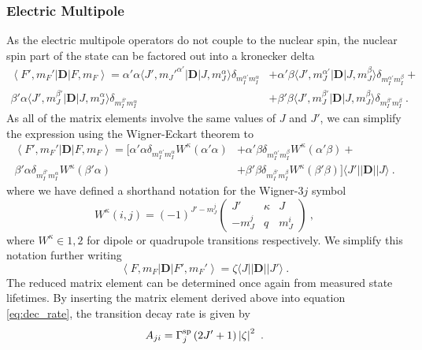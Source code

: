 \documentclass{article}
\begin{document}
\subsubsection{Electric Multipole}
As the electric multipole operators do not couple to the nuclear spin, the nuclear spin part of the state can be factored out into a kronecker delta 
\begin{equation}
\begin{split}
       \left\langle F', m_F'\right|\mathbf{D}\left|F, m_F\right\rangle = \alpha' \alpha \langle J',m_J'^{\alpha'}|\mathbf{D}|J, m_J^{\alpha}\rangle \delta_{m_I^{\alpha'} m_I^{\alpha}} &+ \alpha' \beta \langle J',m_J^{\alpha'}|\mathbf{D}|J, m_J^{\beta}\rangle \delta_{m_I^{\alpha'} m_I^{\beta}} + \\ 
       \beta' \alpha \langle J',m_J^{\beta'}|\mathbf{D}|J, m_J^{\alpha}\rangle \delta_{m_I^{\beta'} m_I^{\alpha}} &+ \beta' \beta \langle J',m_J^{\beta'}|\mathbf{D}|J, m_J^{\beta}\rangle \delta_{m_I^{\beta'} m_I^{\beta}}~.
\end{split}
\end{equation}
As all of the matrix elements involve the same values of $J$ and $J'$, we can simplify the expression using the Wigner-Eckart theorem to
\begin{equation}
\begin{split}
       \left\langle F', m_F'\right|\mathbf{D}\left|F, m_F\right\rangle =  
       [ \alpha' \alpha \delta_{m_I^{\alpha'}  m_I^{\alpha}}  W^{\kappa}\left(\alpha' \alpha\right)  &+ \alpha' \beta \delta_{m_I^{\alpha'} m_I^{\beta}} 
       W^{\kappa}\left(\alpha' \beta\right) + \\
        \beta' \alpha \delta_{m_I^{\beta'} m_I^{\alpha}}
       W^{\kappa}\left(\beta' \alpha\right) &+ 
        \beta' \beta \delta_{m_I^{\beta'} m_I^{\beta}}
        W^{\kappa}\left(\beta' \beta\right) ] \langle J'||\mathbf{D}||J\rangle~.
\end{split}
\end{equation}
where we have defined a shorthand notation for the Wigner-$3j$ symbol
\begin{equation}
W^{\kappa}(i, j) = (-1)^{J'- m_J^{j}} \begin{pmatrix}
        J' & \kappa & J\\
        -m_J^j & q & m_J^{i}
        \end{pmatrix}~,
\end{equation}
where $W^{\kappa} \in 1,2$ for dipole or quadrupole transitions respectively. We simplify this notation further writing
\begin{equation}
    \left\langle F, m_F\right|\mathbf{D}\left|F', m_F'\right\rangle = \zeta \langle J||\mathbf{D}||J'\rangle~.  
\end{equation}
The reduced matrix element can be determined once again from measured state lifetimes. By inserting the matrix element derived above into equation \ref{eq:dec_rate}, the transition decay rate is given by 
\begin{equation}
    A_{ji} = \Gamma^{\rm{sp}}_j \left(2J'+1\right) \left|\zeta\right|^2~.
\end{equation}
\end{document}
